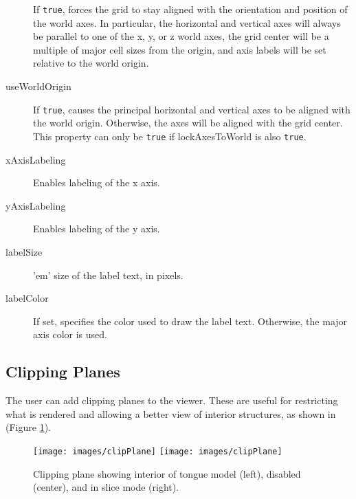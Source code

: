 \documentclass{article}
\begin{document}
\begin{description}
If {\tt true}, forces the grid to stay aligned with the orientation
and position of the world axes. In particular, the horizontal and
vertical axes will always be parallel to one of the x, y, or z world
axes, the grid center will be a multiple of major cell sizes from the
origin, and axis labels will be set relative to the world origin.

\item[useWorldOrigin]\mbox{}

If {\tt true}, causes the principal horizontal and vertical axes to be
aligned with the world origin. Otherwise, the axes will be aligned
with the grid center. This property can only be {\tt true} if {\sf
lockAxesToWorld} is also {\tt true}.

\item[xAxisLabeling]\mbox{}

Enables labeling of the x axis.

\item[yAxisLabeling]\mbox{}

Enables labeling of the y axis.

\item[labelSize]\mbox{}

'em' size of the label text, in pixels.

\item[labelColor]\mbox{}

If set, specifies the color used to draw the label text. Otherwise,
the major axis color is used.

\end{description}

\subsection{Clipping Planes}
\label{ClippingPlanesSec}

The user can add clipping planes to the viewer. These are useful for
restricting what is rendered and allowing a better view of interior
structures, as shown in (Figure \ref{clipPlaneFig}).

\begin{figure}
\begin{center}
\iflatexml
\texttt{[image: images/clipPlane]}
\else
\texttt{[image: images/clipPlane]}
\fi
\end{center}
\caption{Clipping plane showing interior of tongue model (left), disabled (center), and in slice mode (right).}%
\label{clipPlaneFig}
\end{figure}
\end{document}
